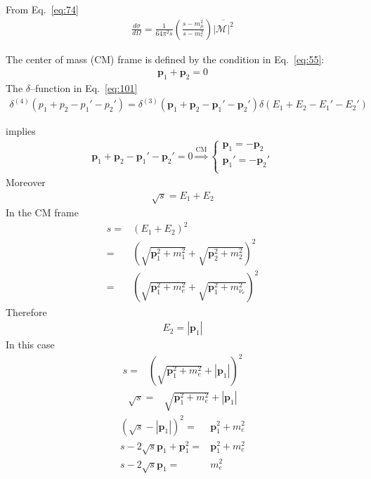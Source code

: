 From Eq.~\eqref{eq:74}
\begin{align}
  \label{eq:103}
  \frac{d\sigma}{d\Omega}=\frac{1}{64\pi^2s}\left(\frac{s-m_\mu^2}{s-m_e^2}\right)\overline{|\mathcal{M}|^2}
\end{align}

The center of mass (CM) frame is defined by the condition in Eq.~\eqref{eq:55}:
\begin{align}
  \mathbf{p}_1+\mathbf{p}_2=0
\end{align}
The $\delta$--function in Eq.~\eqref{eq:101}
\begin{align}
  \delta^{(4)}(p_1+p_2-p_1'-p_2')=\delta^{(3)}(\mathbf{p}_1+\mathbf{p}_2-\mathbf{p}_1'-\mathbf{p}_2')
\delta(E_1+E_2-E_1'-E_2')
\end{align}

implies
\begin{align}
  \mathbf{p}_1+\mathbf{p}_2-\mathbf{p}_1'-\mathbf{p}_2'=0 \overset{\text{CM}}{\Rightarrow}
  \begin{cases}
    \mathbf{p}_1=-\mathbf{p}_2\\
    \mathbf{p}_1'=-\mathbf{p}_2'\\
  \end{cases}
\end{align}
Moreover
\begin{align}
  \sqrt{s}=E_1+E_2
\end{align}
In the CM frame
\begin{align}
\label{eq:104}
s=&\left(E_1+E_2\right)^2\nonumber\\
=&\left(\sqrt{\mathbf{p}_1^2+m_1^2}+\sqrt{\mathbf{p}_2^2+m_2^2}\right)^2\nonumber\\
=&\left(\sqrt{\mathbf{p}_1^2+m_e^2}+\sqrt{\mathbf{p}_1^2+m_{\nu_e}^2}\right)^2
\end{align}
Therefore
\begin{align}
  \label{eq:105}
  E_2=|\mathbf{p}_1|
\end{align}
In this case
\begin{align}
  \label{eq:106}
  s=&\left(\sqrt{\mathbf{p}_1^2+m_e^2}+|\mathbf{p}_1|\right)^2
\end{align}
\begin{align}
   \sqrt{s}=&\sqrt{\mathbf{p}^2_1+m_e^2}+|\mathbf{p}_1|
\end{align}
\begin{align}
\left(\sqrt{s}-|\mathbf{p}_1|\right)^2=&\mathbf{p}^2_1+m_e^2\nonumber\\
s-2\sqrt{s}\mathbf{p}_1+\mathbf{p}^2_1=&\mathbf{p}^2_1+m_e^2\nonumber\\
s-2\sqrt{s}\mathbf{p}_1=&m_e^2
\end{align}
